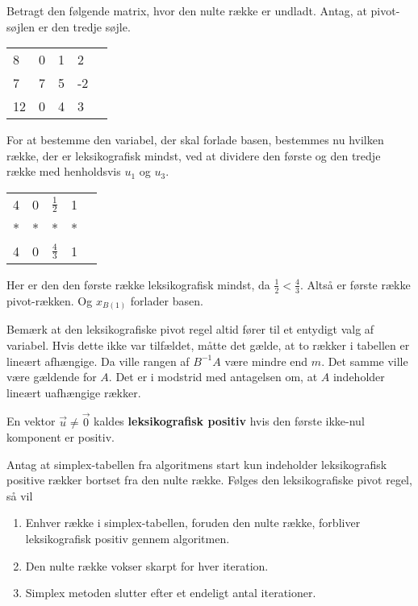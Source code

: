 \begin{eks}
Betragt den følgende matrix, hvor den nulte række er undladt. Antag, at pivot-søjlen er den tredje søjle. 

\begin{center}
\begin{tabular}{|l|llll|}
\hline
8  & 0 & 1 & 2  &  \\
7  & 7 & 5 & -2 &  \\
12 & 0 & 4 & 3  &  \\
\hline
\end{tabular}
\end{center}
For at bestemme den variabel, der skal forlade basen, bestemmes nu hvilken række, der er leksikografisk mindst, ved at dividere den første og den tredje række med henholdsvis $u_1$ og $u_3$.
\begin{center}
\begin{tabular}{|l|llll|}
\hline
4  & 0 & $\frac{1}{2}$ & 1  &  \\
*  & * & * & * &  \\
4 & 0 & $\frac{4}{3}$ & 1  &  \\
\hline
\end{tabular}
\end{center}
Her er den den første række leksikografisk mindst, da $\frac{1}{2}<\frac{4}{3}$.  Altså er første række pivot-rækken. Og $x_{B(1)}$ forlader basen. 
\end{eks}

Bemærk at den leksikografiske pivot regel altid fører til et entydigt valg af variabel. Hvis dette ikke var tilfældet, måtte det gælde, at to rækker i tabellen er lineært afhængige. Da ville rangen af $B^{-1}A$ være mindre end $m$. Det samme ville være gældende for $A$. Det er i modstrid med antagelsen om, at $A$ indeholder lineært uafhængige rækker. 

\begin{defn}
En vektor $\vec{u} \neq \vec{0}$ kaldes \textbf{leksikografisk positiv} hvis den første ikke-nul komponent er positiv.\citep{lexipositiv} 
\end{defn}

 
\begin{stn}
Antag at simplex-tabellen fra algoritmens start kun indeholder leksikografisk positive rækker bortset fra den nulte række. Følges den leksikografiske pivot regel, så vil 
\begin{enumerate}[label=(\alph*)]
\item Enhver række i simplex-tabellen, foruden den nulte række, forbliver leksikografisk positiv gennem algoritmen. 
\item Den nulte række vokser skarpt for hver iteration. 
\item Simplex metoden slutter efter et endeligt antal iterationer. 
\end{enumerate}
\label{stn:lexi}
\end{stn}

